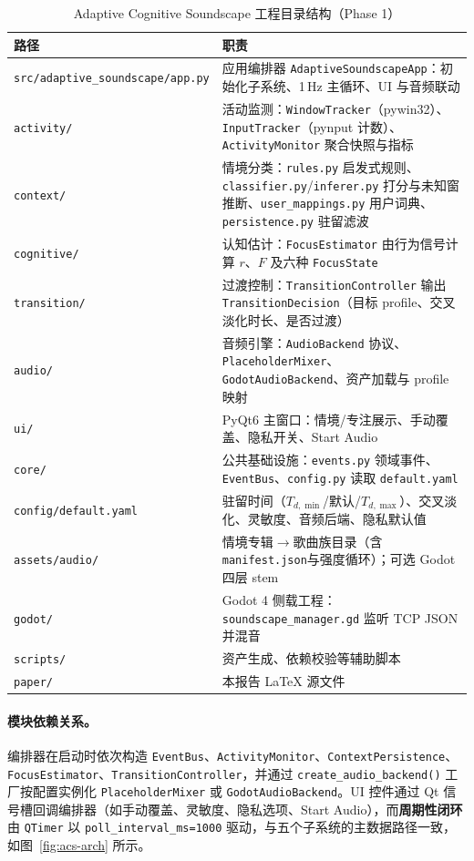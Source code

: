 \documentclass[12pt, fontset=windows]{ctexart}
\begin{document}
\begin{table}[H]
\centering
\caption{Adaptive Cognitive Soundscape 工程目录结构（Phase 1）}
\label{tab:repo-structure}
\small
\begin{tabular}{@{}p{4.2cm}p{9.3cm}@{}}
\toprule
\textbf{路径} & \textbf{职责} \\
\midrule
\texttt{src/adaptive\_soundscape/app.py} & 应用编排器 \texttt{AdaptiveSoundscapeApp}：初始化子系统、1\,Hz 主循环、UI 与音频联动 \\
\texttt{activity/} & 活动监测：\texttt{WindowTracker}（pywin32）、\texttt{InputTracker}（pynput 计数）、\texttt{ActivityMonitor} 聚合快照与指标 \\
\texttt{context/} & 情境分类：\texttt{rules.py} 启发式规则、\texttt{classifier.py}/\texttt{inferer.py} 打分与未知窗推断、\texttt{user\_mappings.py} 用户词典、\texttt{persistence.py} 驻留滤波 \\
\texttt{cognitive/} & 认知估计：\texttt{FocusEstimator} 由行为信号计算 $r$、$F$ 及六种 \texttt{FocusState} \\
\texttt{transition/} & 过渡控制：\texttt{TransitionController} 输出 \texttt{TransitionDecision}（目标 profile、交叉淡化时长、是否过渡） \\
\texttt{audio/} & 音频引擎：\texttt{AudioBackend} 协议、\texttt{PlaceholderMixer}、\texttt{GodotAudioBackend}、资产加载与 profile 映射 \\
\texttt{ui/} & PyQt6 主窗口：情境/专注展示、手动覆盖、隐私开关、Start Audio \\
\texttt{core/} & 公共基础设施：\texttt{events.py} 领域事件、\texttt{EventBus}、\texttt{config.py} 读取 \texttt{default.yaml} \\
\texttt{config/default.yaml} & 驻留时间（$T_{d,\min}$/默认/$T_{d,\max}$）、交叉淡化、灵敏度、音频后端、隐私默认值 \\
\texttt{assets/audio/} & 情境专辑$\rightarrow$歌曲族目录（含\texttt{manifest.json}与强度循环）；可选 Godot 四层 stem \\
\texttt{godot/} & Godot 4 侧载工程：\texttt{soundscape\_manager.gd} 监听 TCP JSON 并混音 \\
\texttt{scripts/} & 资产生成、依赖校验等辅助脚本 \\
\texttt{paper/} & 本报告 LaTeX 源文件 \\
\bottomrule
\end{tabular}
\end{table}

\paragraph{模块依赖关系。}编排器在启动时依次构造 \texttt{EventBus}、\texttt{ActivityMonitor}、\texttt{ContextPersistence}、\texttt{FocusEstimator}、\texttt{TransitionController}，并通过 \texttt{create\_audio\_backend()} 工厂按配置实例化 \texttt{PlaceholderMixer} 或 \texttt{GodotAudioBackend}。UI 控件通过 Qt 信号槽回调编排器（如手动覆盖、灵敏度、隐私选项、Start Audio），而\textbf{周期性闭环}由 \texttt{QTimer} 以 \texttt{poll\_interval\_ms=1000} 驱动，与五个子系统的主数据路径一致，如图~\ref{fig:acs-arch} 所示。
\end{document}
